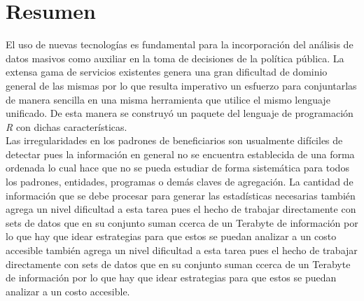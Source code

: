 \section*{Resumen}
El uso de nuevas tecnologías es fundamental para la incorporación del análisis de datos masivos como auxiliar en la toma de decisiones de la política pública. La extensa gama de servicios existentes genera una gran dificultad de dominio general de las mismas por lo que resulta imperativo un esfuerzo para conjuntarlas de manera sencilla   en una misma herramienta que utilice el mismo lenguaje unificado. De esta manera se construyó un paquete del lenguaje de programación \textit{R} con dichas características.\\
Las irregularidades en los padrones de beneficiarios son usualmente difíciles de detectar pues la información en general no se encuentra establecida de una forma ordenada lo cual hace que no se pueda estudiar de forma sistemática para todos los padrones, entidades, programas o demás claves de agregación. La cantidad de información que se debe procesar para generar las estadísticas necesarias también agrega un nivel dificultad a esta tarea pues el hecho de trabajar directamente con sets de datos que en su conjunto suman ccerca de un Terabyte de información por lo que hay que idear estrategias para que estos se puedan analizar a un costo accesible también agrega un nivel dificultad  a esta tarea pues el hecho de trabajar directamente con sets de datos que en su conjunto suman ccerca de un Terabyte de información por lo que hay que idear estrategias para que estos se puedan analizar a un costo accesible.
\clearpage

